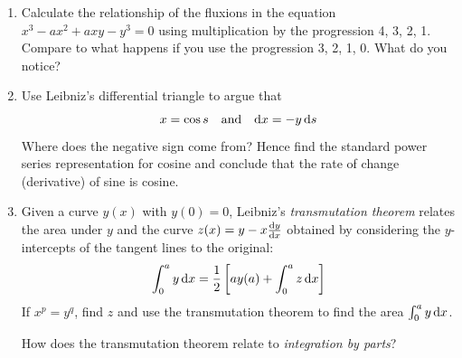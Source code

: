 \begin{exercises}{}{}
\begin{enumerate}
	

	
	
	\item%
	Calculate the relationship of the fluxions in the equation $x^3-ax^2+axy-y^3=0$ using multiplication by the progression 4, 3, 2, 1. Compare to what happens if you use the progression 3, 2, 1, 0. What do you notice?
	
	
	\item Use Leibniz's differential triangle to argue that
	\[
		x=\cos s\quad\text{and}\quad \dx=-y\,\ds
	\]
	Where does the negative sign come from? Hence find the standard power series representation for cosine and conclude that the rate of change (derivative) of sine is cosine.
	

	\item%
	Given a curve $y(x)$ with $y(0)=0$, Leibniz's \emph{transmutation theorem} relates the area under $y$ and the curve $z(x)=y-x\diff[y]{x}$ obtained by considering the $y$-intercepts of the tangent lines to the original:
	\[
		\int_0^a y\,\dx=\frac 12\left[ay(a)+\int_0^a z\,\dx\right]
	\]
	If $x^p=y^q$, find $z$ and use the transmutation theorem to find the area $\int_0^a y\,\dx$.\par
	How does the transmutation theorem relate to \emph{integration by parts}?
	

\end{enumerate}
\end{exercises}
